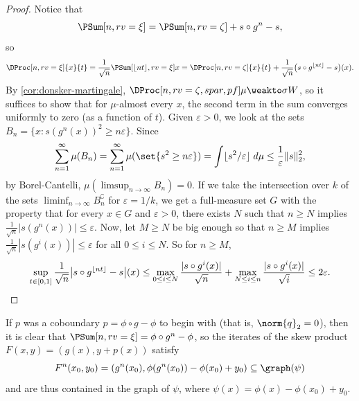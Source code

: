 \documentclass[../main]{subfiles}
\begin{document}
\begin{proof}
  Notice that
\begin{equation*}
  \PSum[n,rv = \xi] = \PSum[n,rv = \zeta] + s \circ g^n - s,
\end{equation*}
so
\begin{equation*}
  \DProc[n,rv=\xi]{x}{t}
  = \frac{1}{\sqrt{n}}\PSum[\floor{nt},rv=\xi]{x} = \DProc[n,rv=\zeta]{x}{t} + \frac{1}{\sqrt{n}} \big(s \circ g^{\floor{nt}} - s\big)(x).
\end{equation*}
By \cref{cor:donsker-martingale}, \(\DProc[n,rv = \zeta,spar,pf]\mu \weakto \sigma W\), so it suffices to show that for \(\mu\)-almost every \(x\), the second term in the sum converges uniformly to zero (as a function of \(t\)). Given \(\varepsilon > 0\), we look at the sets \(B_n = \{ x :s(g^n(x))^2\geq n \varepsilon \}\). Since
\begin{equation*}
  \sum_{n = 1}^{\infty}\mu(B_n) = \sum_{n = 1}^{\infty}\mu(\set{s^2 \geq n \varepsilon}) = \int \floor{s^2/ \varepsilon} \;d\mu \leq \frac{1}{\varepsilon} \lVert s \rVert_2^2,
\end{equation*}
by Borel-Cantelli, \(\mu(\limsup_{n \to \infty}B_n) = 0\). If we take the intersection over \(k\) of the sets \(\liminf_{n \to \infty}B_n^{\complement}\) for \(\varepsilon = 1/k\), we get a full-measure set \(G\) with the property that for every \(x \in G\) and \(\varepsilon > 0\), there exists \(N\) such that \(n \geq N\) implies \(\frac{1}{\sqrt{n}}|s(g^n(x))| \leq \varepsilon\). Now, let \(M \geq N\) be big enough so that \(n \geq M\) implies \(\frac{1}{\sqrt{n}}|s(g^i(x))| \leq \varepsilon\) for all \(0 \leq i \leq N\). So for \(n \geq M\),
\begin{equation*}
  \sup_{t \in [0,1]}\frac{1}{\sqrt{n}} \big\lvert s \circ g^{\lfloor nt\rfloor} - s\big\rvert(x) \leq 
  \max_{0 \leq i \leq N}\frac{|s \circ g^{i}(x)|}{\sqrt{n}} + 
  \max_{N \leq i \le n}\frac{|s \circ g^{i}(x)|}{\sqrt{i}} 
  \leq 2\varepsilon.
\end{equation*}
\end{proof}

\begin{remark}
  If \(p\) was a coboundary \(p = \phi \circ g - \phi\) to begin with (that is, \(\norm{q}_2 = 0\)), then it is clear that \(\PSum[n,rv = \xi] = \phi \circ g^n - \phi\), so the iterates of the skew product \(F(x,y) = (g(x), y + p(x))\) satisfy
  \begin{equation*}
    F^n(x_0,y_0) = (g^n(x_0), \phi(g^n(x_0)) - \phi(x_0) + y_0) \subseteq \graph(\psi)
  \end{equation*}
  and are thus contained in the graph of \(\psi\), where \(\psi(x) = \phi(x) - \phi(x_0) + y_0\).
\end{remark}
\end{document}
